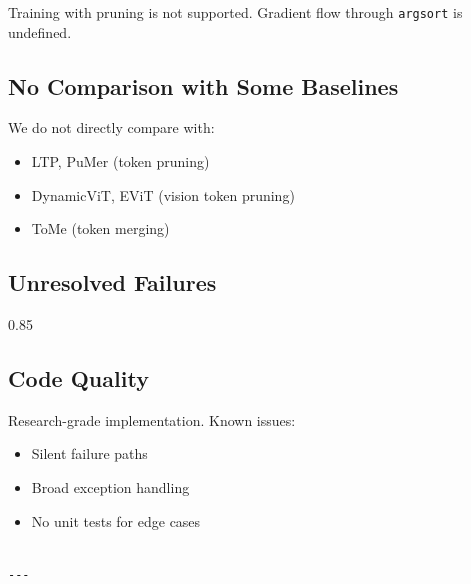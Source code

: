 Training with pruning is not supported. Gradient flow through \texttt{argsort} 
is undefined.

\subsection{No Comparison with Some Baselines}

We do not directly compare with:

\begin{itemize}
\item LTP, PuMer (token pruning)
\item DynamicViT, EViT (vision token pruning)
\item ToMe (token merging)

\end{itemize}
\subsection{Unresolved Failures}

0.85

\subsection{Code Quality}

Research-grade implementation. Known issues:

\begin{itemize}
\item Silent failure paths
\item Broad exception handling
\item No unit tests for edge cases
\end{itemize}
\begin{lstlisting}

---
\end{lstlisting}